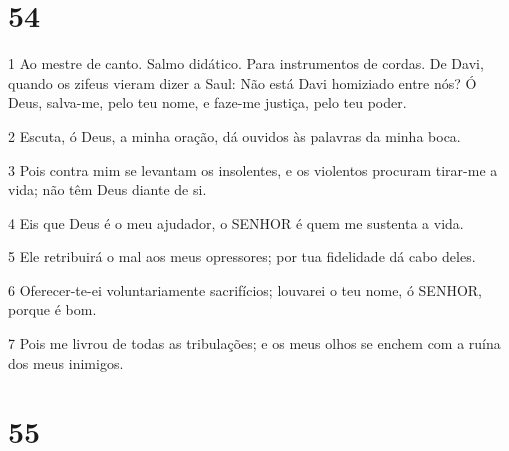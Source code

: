 \chapter{54}

\par 1 Ao mestre de canto. Salmo didático. Para instrumentos de cordas. De Davi, quando os zifeus vieram dizer a Saul: Não está Davi homiziado entre nós? Ó Deus, salva-me, pelo teu nome, e faze-me justiça, pelo teu poder.
\par 2 Escuta, ó Deus, a minha oração, dá ouvidos às palavras da minha boca.
\par 3 Pois contra mim se levantam os insolentes, e os violentos procuram tirar-me a vida; não têm Deus diante de si.
\par 4 Eis que Deus é o meu ajudador, o SENHOR é quem me sustenta a vida.
\par 5 Ele retribuirá o mal aos meus opressores; por tua fidelidade dá cabo deles.
\par 6 Oferecer-te-ei voluntariamente sacrifícios; louvarei o teu nome, ó SENHOR, porque é bom.
\par 7 Pois me livrou de todas as tribulações; e os meus olhos se enchem com a ruína dos meus inimigos.

\chapter{55}

